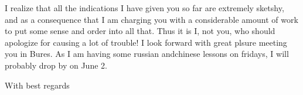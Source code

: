 
I realize that all the indications I have given you so far are extremely sketshy, and as a consequence that I am charging you with a considerable amount of work to put some sense and order into all that. Thus it is I, not you, who should apologize for causing a lot of trouble! I look forward with great plsure meeting you in Bures. As I am having some russian andchinese lessons on fridays, I will probably drop by on June 2.

With best regards\\

